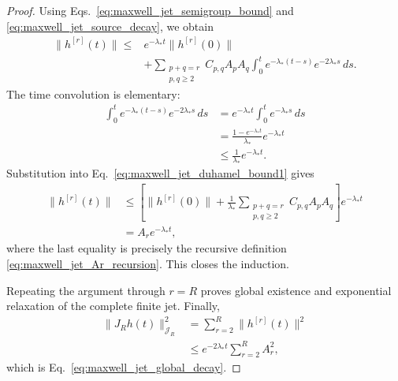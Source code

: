 \documentclass[10pt,a4paper]{amsart}
\begin{document}
\begin{proof}
Using Eqs.~\eqref{eq:maxwell_jet_semigroup_bound} and
\eqref{eq:maxwell_jet_source_decay}, we obtain
\begin{align}
\|h^{[r]}(t)\|
\leq{}&
e^{-\lambda_*t}
\|h^{[r]}(0)\|
\nonumber\\
&+
\sum_{\substack{p+q=r\\p,q\geq2}}
C_{p,q}A_pA_q
\int_0^t
e^{-\lambda_*(t-s)}
e^{-2\lambda_*s}
\,ds .
\label{eq:maxwell_jet_duhamel_bound1}
\end{align}
The time convolution is elementary:
\begin{align}
\int_0^t
e^{-\lambda_*(t-s)}
e^{-2\lambda_*s}
\,ds
&=
e^{-\lambda_*t}
\int_0^t
e^{-\lambda_*s}\,ds
\nonumber\\
&=
\frac{
1-e^{-\lambda_*t}
}{
\lambda_*
}
e^{-\lambda_*t}
\nonumber\\
&\leq
\frac{1}{\lambda_*}
e^{-\lambda_*t}.
\label{eq:maxwell_jet_convolution_bound}
\end{align}
Substitution into
Eq.~\eqref{eq:maxwell_jet_duhamel_bound1} gives
\begin{align}
\|h^{[r]}(t)\|
&\leq
\left[
\|h^{[r]}(0)\|
+
\frac{1}{\lambda_*}
\sum_{\substack{p+q=r\\p,q\geq2}}
C_{p,q}A_pA_q
\right]
e^{-\lambda_*t}
\nonumber\\
&=
A_re^{-\lambda_*t},
\end{align}
where the last equality is precisely the recursive definition
\eqref{eq:maxwell_jet_Ar_recursion}.  This closes the induction.

Repeating the argument through $r=R$ proves global existence and
exponential relaxation of the complete finite jet.  Finally,
\begin{align}
\|J_Rh(t)\|_{\mathscr J_R}^2
&=
\sum_{r=2}^{R}
\|h^{[r]}(t)\|^2
\nonumber\\
&\leq
e^{-2\lambda_*t}
\sum_{r=2}^{R}A_r^2,
\end{align}
which is Eq.~\eqref{eq:maxwell_jet_global_decay}.
\end{proof}
\end{document}
